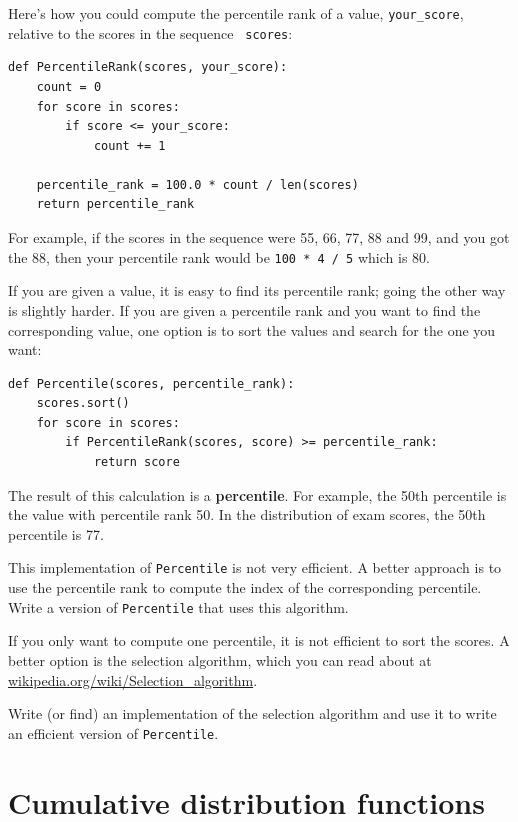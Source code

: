 \documentclass[12pt]{book}
\begin{document}
Here's how you could compute the percentile rank of a value,
\verb"your_score", relative to the scores in the sequence {\tt
  scores}:

\begin{verbatim}
def PercentileRank(scores, your_score):
    count = 0
    for score in scores:
        if score <= your_score:
            count += 1

    percentile_rank = 100.0 * count / len(scores)
    return percentile_rank
\end{verbatim}
%
%
For example, if the scores in the sequence were 55, 66, 77, 88 and 99,
and you got the 88, then your percentile rank would be {\tt 100 * 4 / 5}
which is 80.

If you are given a value, it is easy to find its percentile rank; going
the other way is slightly harder.  If you are given a percentile rank
and you want to find the corresponding value, one option is to
sort the values and search for the one you want:

\begin{verbatim}
def Percentile(scores, percentile_rank):
    scores.sort()
    for score in scores:
        if PercentileRank(scores, score) >= percentile_rank:
            return score
\end{verbatim}

The result of this calculation is a {\bf percentile}.  For example,
the 50th percentile is the value with percentile rank 50.  In the
distribution of exam scores, the 50th percentile is 77.

\begin{ex}
This implementation of {\tt Percentile} is not very efficient.  A
better approach is to use the percentile rank to compute the index of
the corresponding percentile.  Write a version of {\tt Percentile} that
uses this algorithm.
\end{ex}

\begin{ex}

If you only want to compute one percentile, it is not efficient
to sort the scores.  A better option is the selection algorithm,
which you can read about at \url{wikipedia.org/wiki/Selection_algorithm}.

Write (or find) an implementation of the selection algorithm and use
it to write an efficient version of {\tt Percentile}.

\end{ex}


\section{Cumulative distribution functions}
\end{document}
